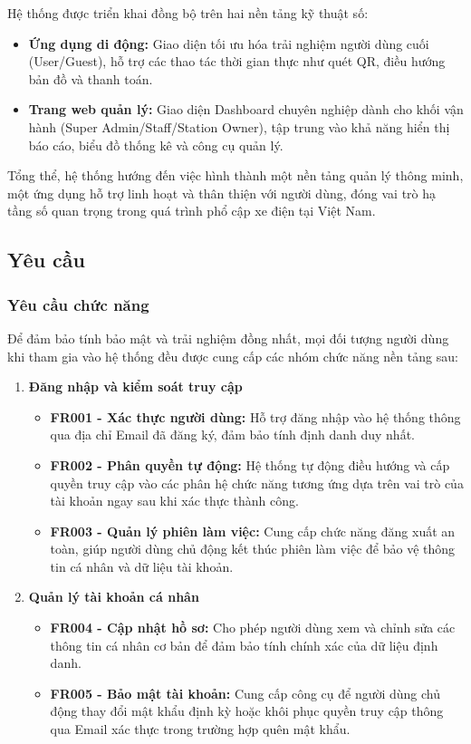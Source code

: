 Hệ thống được triển khai đồng bộ trên hai nền tảng kỹ thuật số:
\begin{itemize}
    \item \textbf{Ứng dụng di động:} Giao diện tối ưu hóa trải nghiệm người dùng cuối (User/Guest), hỗ trợ các thao tác thời gian thực như quét QR, điều hướng bản đồ và thanh toán.
    \item \textbf{Trang web quản lý:} Giao diện Dashboard chuyên nghiệp dành cho khối vận hành (Super Admin/Staff/Station Owner), tập trung vào khả năng hiển thị báo cáo, biểu đồ thống kê và công cụ quản lý.
\end{itemize}

Tổng thể, hệ thống hướng đến việc hình thành một nền tảng quản lý thông minh, một ứng dụng hỗ trợ linh hoạt và thân thiện với người dùng, đóng vai trò hạ tầng số quan trọng trong quá trình phổ cập xe điện tại Việt Nam.
\subsection{Yêu cầu}
\subsubsection{Yêu cầu chức năng}

Để đảm bảo tính bảo mật và trải nghiệm đồng nhất, mọi đối tượng người dùng khi tham gia vào hệ thống đều được cung cấp các nhóm chức năng nền tảng sau:
\begin{enumerate}[label=\textbf{\alph*)}]
 \item \textbf{Đăng nhập và kiểm soát truy cập}
 \begin{itemize}
    \item \textbf{FR001 - Xác thực người dùng:} Hỗ trợ đăng nhập vào hệ thống thông qua địa chỉ Email đã đăng ký, đảm bảo tính định danh duy nhất.
    \item \textbf{FR002 - Phân quyền tự động:} Hệ thống tự động điều hướng và cấp quyền truy cập vào các phân hệ chức năng tương ứng dựa trên vai trò của tài khoản ngay sau khi xác thực thành công.
    \item \textbf{FR003 - Quản lý phiên làm việc:} Cung cấp chức năng đăng xuất an toàn, giúp người dùng chủ động kết thúc phiên làm việc để bảo vệ thông tin cá nhân và dữ liệu tài khoản.
 \end{itemize}
 \item \textbf{Quản lý tài khoản cá nhân}
 \begin{itemize}
    \item \textbf{FR004 - Cập nhật hồ sơ:} Cho phép người dùng xem và chỉnh sửa các thông tin cá nhân cơ bản để đảm bảo tính chính xác của dữ liệu định danh.
    \item \textbf{FR005 - Bảo mật tài khoản:} Cung cấp công cụ để người dùng chủ động thay đổi mật khẩu định kỳ hoặc khôi phục quyền truy cập thông qua Email xác thực trong trường hợp quên mật khẩu.
 \end{itemize}
\end{enumerate}

